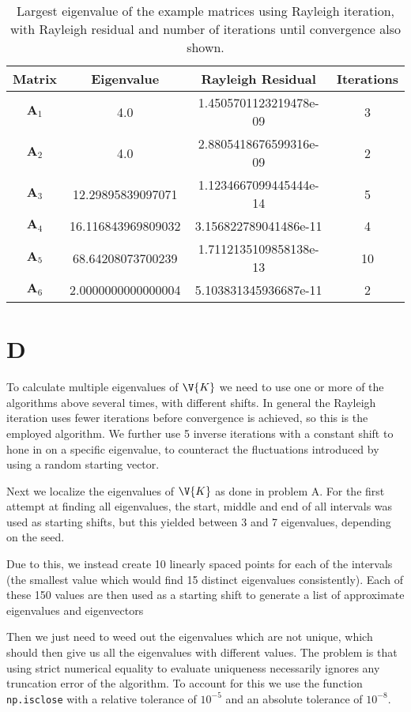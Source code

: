 \documentclass[a4paper,10pt]{article}
\begin{document}
	\begin{table}[H]
		\centering
		\begin{tabular}{c|c|c|c}
			Matrix & Eigenvalue & Rayleigh Residual & Iterations \\
			\hline
			$ \textbf{A}_1 $ & 4.0 &1.4505701123219478e-09 & 3\\
			$ \textbf{A}_2 $ & 4.0 &2.8805418676599316e-09 & 2\\
			$ \textbf{A}_3 $ & 12.29895839097071 & 1.1234667099445444e-14 & 5\\
			$ \textbf{A}_4 $ & 16.116843969809032 & 3.156822789041486e-11 & 4\\
			$ \textbf{A}_5 $ & 68.64208073700239 & 1.7112135109858138e-13 & 10\\
			$ \textbf{A}_6 $ & 2.0000000000000004 & 5.103831345936687e-11 & 2
		\end{tabular}
		\caption{Largest eigenvalue of the example matrices using Rayleigh iteration, with Rayleigh residual and number of iterations until convergence also shown.}
		\label{tab:rayleigh_iter}
	\end{table}
	
	
	\section*{D}
	To calculate multiple eigenvalues of $ \V{K} $ we need to use one or more of the algorithms above several times, with different shifts. In general the Rayleigh iteration uses fewer iterations before convergence is achieved, so this is the employed algorithm. We further use 5 inverse iterations with a constant shift to hone in on a specific eigenvalue, to counteract the fluctuations introduced by using a random starting vector.
	
	Next we localize the eigenvalues of $ \V{K} $ as done in problem A. For the first attempt at finding all eigenvalues, the start, middle and end of all intervals was used as starting shifts, but this yielded between 3 and 7 eigenvalues, depending on the seed.
	
	Due to this, we instead create 10 linearly spaced points for each of the intervals (the smallest value which would find 15 distinct eigenvalues consistently). Each of these 150 values are then used as a starting shift to generate a list of approximate eigenvalues and eigenvectors
	
	Then we just need to weed out the eigenvalues which are not unique, which should then give us all the eigenvalues with different values. The problem is that using strict numerical equality to evaluate uniqueness necessarily ignores any truncation error of the algorithm. To account for this we use the function \texttt{np.isclose} with a relative tolerance of $ 10^{-5} $ and an absolute tolerance of $ 10^{-8} $.
	
\end{document}
